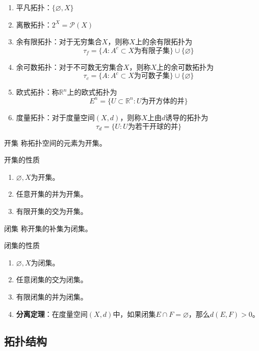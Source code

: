 \documentclass[lang = cn, scheme = chinese, thmcnt = section, usesamecnt]{elegantbook}
\newcommand{\R}{\mathbb{R}}            %
\newcommand{\sub}{\subset}             %
\begin{document}
\begin{example}
	\begin{enumerate}
		\item 平凡拓扑：$\{\varnothing,X\}$
		\item 离散拓扑：$2^X=\mathscr{P}(X)$
		\item 余有限拓扑：对于无穷集合$X$，则称$X$上的余有限拓扑为
		$$
		\tau_f=\{A:A^c\sub X\text{为有限子集}\}\cup\{\varnothing\}
		$$
		\item 余可数拓扑：对于不可数无穷集合$X$，则称$X$上的余可数拓扑为
		$$
		\tau_c=\{A:A^c\sub X\text{为可数子集}\}\cup\{\varnothing\}
		$$
		\item 欧式拓扑：称$\R^n$上的欧式拓扑为
		$$
		E^n=\{U\sub\R^n:U\text{为开方体的并}\}
		$$
		\item 度量拓扑：对于度量空间$(X,d)$，则称$X$上由$d$诱导的拓扑为
		$$
		\tau_d=\{ U:U\text{为若干开球的并} \}
		$$
	\end{enumerate}
\end{example}

\begin{definition}{开集}
	称拓扑空间的元素为开集。
\end{definition}

\begin{proposition}{开集的性质}
	\begin{enumerate}
		\item $\varnothing,X$为开集。
		\item 任意开集的并为开集。
		\item 有限开集的交为开集。
	\end{enumerate}
\end{proposition}

\begin{definition}{闭集}
	称开集的补集为闭集。
\end{definition}

\begin{proposition}{闭集的性质}
	\begin{enumerate}
		\item $\varnothing,X$为闭集。
		\item 任意闭集的交为闭集。
		\item 有限闭集的并为闭集。
		\item {\bf 分离定理}：在度量空间$(X,d)$中，如果闭集$E\cap F=\varnothing$，那么$d(E,F)>0$。
	\end{enumerate}
\end{proposition}

\subsection{拓扑结构}
\end{document}
